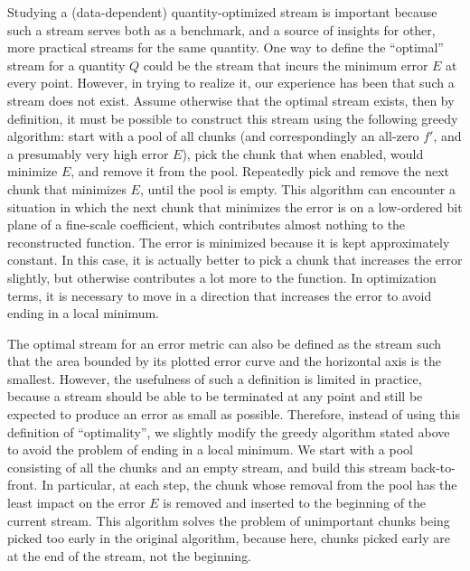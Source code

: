 Studying a (data-dependent) quantity-optimized stream is important because such a stream serves both
as a benchmark, and a source of insights for other, more practical streams for the same quantity.
One way to define the ``optimal'' stream for a quantity $Q$ could be the stream that incurs the
minimum error $E$ at every point. However, in trying to realize it, our experience has been that
such a stream does not exist. Assume otherwise that the optimal stream exists, then by definition,
it must be possible to construct this stream using the following greedy algorithm: start with a pool of all chunks (and
correspondingly an all-zero $f'$, and a presumably very high error $E$), pick the
chunk that when enabled, would minimize $E$, and remove it from the pool. Repeatedly pick and remove
the next chunk that minimizes $E$, until the pool is empty. This algorithm can encounter a situation
in which the next chunk that minimizes the error is on a low-ordered bit plane of a fine-scale
coefficient, which contributes almost nothing to the reconstructed function. The error is minimized
because it is kept approximately constant. In this case, it is actually better to pick a chunk that
increases the error slightly, but otherwise contributes a lot more to the function. In optimization
terms, it is necessary to move in a direction that increases the error to avoid ending in a local
minimum.

The optimal stream for an error metric can also be defined as the stream such that the area bounded
by its plotted error curve and the horizontal axis is the smallest. However, the usefulness of such
a definition is limited in practice, because a stream should be able to be terminated at any point
and still be expected to produce an error as small as possible. Therefore, instead of using this
definition of ``optimality'', we slightly modify the greedy algorithm stated above to avoid the
problem of ending in a local minimum. We start with a pool consisting of all the chunks and an empty
stream, and build this stream back-to-front. In particular, at each step, the chunk whose removal
from the pool has the least impact on the error $E$ is removed and inserted to the beginning of the
current stream. This algorithm solves the problem of unimportant chunks being picked too early in
the original algorithm, because here, chunks picked early are at the end of the stream, not the
beginning.

